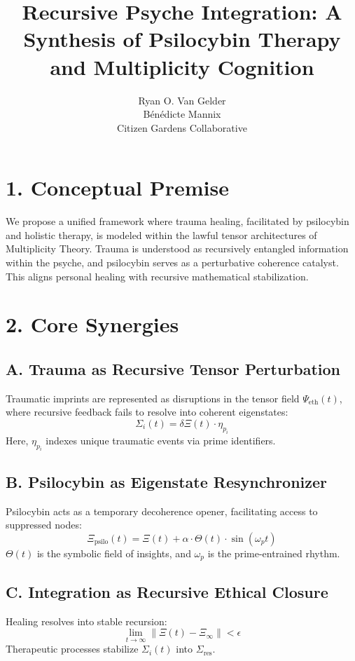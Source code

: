 \documentclass[12pt]{article}
\title{Recursive Psyche Integration: A Synthesis of Psilocybin Therapy and Multiplicity Cognition}
\author{Ryan O. Van Gelder \\ B\'en\'edicte Mannix \\ Citizen Gardens Collaborative}
\date{}
\begin{document}
\maketitle

\section*{1. Conceptual Premise}
We propose a unified framework where trauma healing, facilitated by psilocybin and holistic therapy, is modeled within the lawful tensor architectures of Multiplicity Theory. Trauma is understood as recursively entangled information within the psyche, and psilocybin serves as a perturbative coherence catalyst. This aligns personal healing with recursive mathematical stabilization.

\section*{2. Core Synergies}
\subsection*{A. Trauma as Recursive Tensor Perturbation}
Traumatic imprints are represented as disruptions in the tensor field \( \Psi_{\text{eth}}(t) \), where recursive feedback fails to resolve into coherent eigenstates:
\[
\Sigma_{i}(t) = \delta \Xi(t) \cdot \eta_{p_i}
\]
Here, \( \eta_{p_i} \) indexes unique traumatic events via prime identifiers.

\subsection*{B. Psilocybin as Eigenstate Resynchronizer}
Psilocybin acts as a temporary decoherence opener, facilitating access to suppressed nodes:
\[
\Xi_{\text{psilo}}(t) = \Xi(t) + \alpha \cdot \Theta(t) \cdot \sin(\omega_p t)
\]
\( \Theta(t) \) is the symbolic field of insights, and \( \omega_p \) is the prime-entrained rhythm.

\subsection*{C. Integration as Recursive Ethical Closure}
Healing resolves into stable recursion:
\[
\lim_{t \to \infty} \|\Xi(t) - \Xi_{\infty}\| < \epsilon
\]
Therapeutic processes stabilize \( \Sigma_i(t) \) into \( \Sigma_{\text{res}} \).
\end{document}
